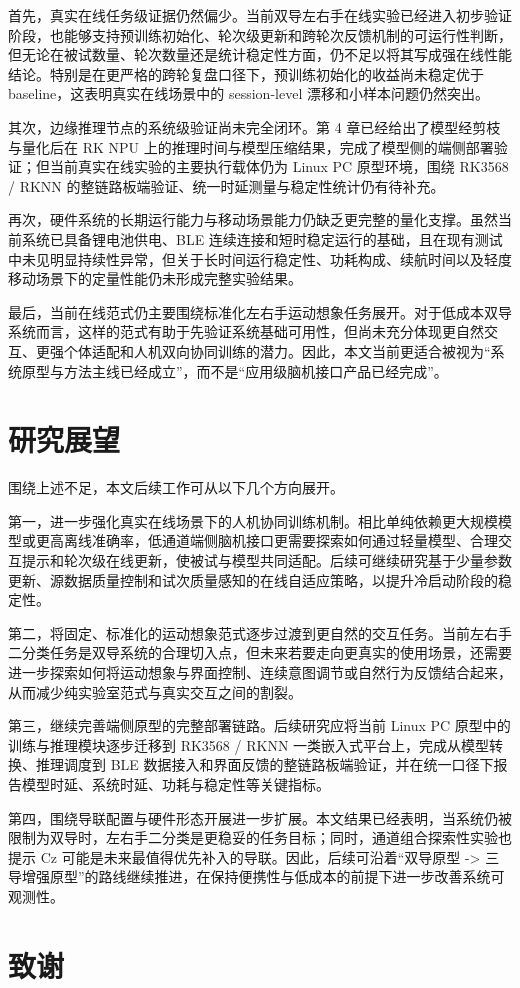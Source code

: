 首先，真实在线任务级证据仍然偏少。当前双导左右手在线实验已经进入初步验证阶段，也能够支持预训练初始化、轮次级更新和跨轮次反馈机制的可运行性判断，但无论在被试数量、轮次数量还是统计稳定性方面，仍不足以将其写成强在线性能结论。特别是在更严格的跨轮复盘口径下，预训练初始化的收益尚未稳定优于 baseline，这表明真实在线场景中的 session-level 漂移和小样本问题仍然突出。

其次，边缘推理节点的系统级验证尚未完全闭环。第 4 章已经给出了模型经剪枝与量化后在 RK NPU 上的推理时间与模型压缩结果，完成了模型侧的端侧部署验证；但当前真实在线实验的主要执行载体仍为 Linux PC 原型环境，围绕 RK3568 / RKNN 的整链路板端验证、统一时延测量与稳定性统计仍有待补充。

再次，硬件系统的长期运行能力与移动场景能力仍缺乏更完整的量化支撑。虽然当前系统已具备锂电池供电、BLE 连续连接和短时稳定运行的基础，且在现有测试中未见明显持续性异常，但关于长时间运行稳定性、功耗构成、续航时间以及轻度移动场景下的定量性能仍未形成完整实验结果。

最后，当前在线范式仍主要围绕标准化左右手运动想象任务展开。对于低成本双导系统而言，这样的范式有助于先验证系统基础可用性，但尚未充分体现更自然交互、更强个体适配和人机双向协同训练的潜力。因此，本文当前更适合被视为“系统原型与方法主线已经成立”，而不是“应用级脑机接口产品已经完成”。

\section{研究展望}

围绕上述不足，本文后续工作可从以下几个方向展开。

第一，进一步强化真实在线场景下的人机协同训练机制。相比单纯依赖更大规模模型或更高离线准确率，低通道端侧脑机接口更需要探索如何通过轻量模型、合理交互提示和轮次级在线更新，使被试与模型共同适配。后续可继续研究基于少量参数更新、源数据质量控制和试次质量感知的在线自适应策略，以提升冷启动阶段的稳定性。

第二，将固定、标准化的运动想象范式逐步过渡到更自然的交互任务。当前左右手二分类任务是双导系统的合理切入点，但未来若要走向更真实的使用场景，还需要进一步探索如何将运动想象与界面控制、连续意图调节或自然行为反馈结合起来，从而减少纯实验室范式与真实交互之间的割裂。

第三，继续完善端侧原型的完整部署链路。后续研究应将当前 Linux PC 原型中的训练与推理模块逐步迁移到 RK3568 / RKNN 一类嵌入式平台上，完成从模型转换、推理调度到 BLE 数据接入和界面反馈的整链路板端验证，并在统一口径下报告模型时延、系统时延、功耗与稳定性等关键指标。

第四，围绕导联配置与硬件形态开展进一步扩展。本文结果已经表明，当系统仍被限制为双导时，左右手二分类是更稳妥的任务目标；同时，通道组合探索性实验也提示 Cz 可能是未来最值得优先补入的导联。因此，后续可沿着“双导原型 -> 三导增强原型”的路线继续推进，在保持便携性与低成本的前提下进一步改善系统可观测性。

\section*{致谢}

